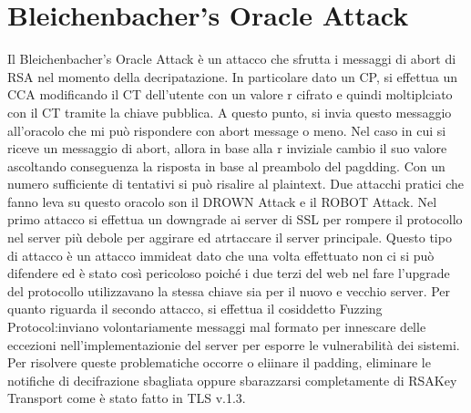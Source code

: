 \documentclass[a4paper,draft]{article}
\begin{document}
\section{Bleichenbacher's Oracle Attack}
Il Bleichenbacher's Oracle Attack è un attacco che sfrutta i messaggi di abort di RSA nel momento della decripatazione\@. In particolare dato un CP, si effettua un CCA modificando il CT dell'utente con un valore r cifrato e quindi moltiplciato con il CT tramite la chiave pubblica\@. A questo punto, si invia questo messaggio all'oracolo che mi può rispondere con abort message o meno\@. Nel caso in cui si riceve un messaggio di abort, allora in base alla r inviziale cambio il suo valore ascoltando conseguenza la risposta in base al preambolo del pagdding\@.\newline
Con un numero sufficiente di tentativi si può risalire al plaintext\@.\newline
Due attacchi pratici che fanno leva su questo oracolo son il DROWN Attack e il ROBOT Attack\@. Nel primo attacco si effettua un downgrade ai server di SSL per rompere il protocollo nel server più debole per aggirare ed atrtaccare il server principale\@. Questo tipo di attacco è un attacco immideat dato che una volta effettuato non ci si può difendere ed è stato così pericoloso poiché i due terzi del web nel fare l'upgrade del protocollo utilizzavano la stessa chiave sia per il nuovo e vecchio server\@.\newline
Per quanto riguarda il secondo attacco, si effettua il cosiddetto Fuzzing Protocol:\@si inviano volontariamente messaggi mal formato per innescare delle eccezioni nell'implementazionie del server per esporre le vulnerabilità dei sistemi\@.\newline
Per risolvere queste problematiche occorre o eliinare il padding, eliminare le notifiche di decifrazione sbagliata oppure sbarazzarsi completamente di RSAKey Transport come è stato fatto in TLS v.1.3\@.
\end{document}

